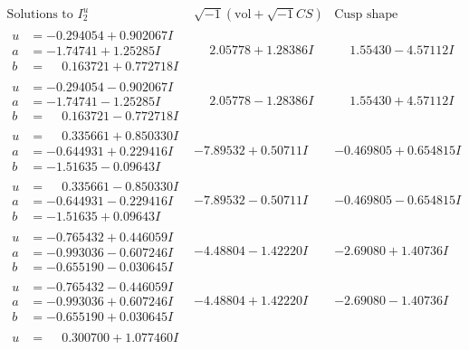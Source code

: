 \documentclass[1p]{elsarticle_modified}
\theoremstyle{definition}
\newcommand{\I}{\sqrt{-1}}
\begin{document}
$$\begin{array}{c|c|c}  
\text{Solutions to }I^u_{2}& \I (\text{vol} + \sqrt{-1}CS) & \text{Cusp shape}\\
 \hline 
\begin{aligned}
u &= -0.294054 + 0.902067 I \\
a &= -1.74741 + 1.25285 I \\
b &= \phantom{-}0.163721 + 0.772718 I\end{aligned}
 & \phantom{-}2.05778 + 1.28386 I & \phantom{-}1.55430 - 4.57112 I \\ \hline\begin{aligned}
u &= -0.294054 - 0.902067 I \\
a &= -1.74741 - 1.25285 I \\
b &= \phantom{-}0.163721 - 0.772718 I\end{aligned}
 & \phantom{-}2.05778 - 1.28386 I & \phantom{-}1.55430 + 4.57112 I \\ \hline\begin{aligned}
u &= \phantom{-}0.335661 + 0.850330 I \\
a &= -0.644931 + 0.229416 I \\
b &= -1.51635 - 0.09643 I\end{aligned}
 & -7.89532 + 0.50711 I & -0.469805 + 0.654815 I \\ \hline\begin{aligned}
u &= \phantom{-}0.335661 - 0.850330 I \\
a &= -0.644931 - 0.229416 I \\
b &= -1.51635 + 0.09643 I\end{aligned}
 & -7.89532 - 0.50711 I & -0.469805 - 0.654815 I \\ \hline\begin{aligned}
u &= -0.765432 + 0.446059 I \\
a &= -0.993036 - 0.607246 I \\
b &= -0.655190 - 0.030645 I\end{aligned}
 & -4.48804 - 1.42220 I & -2.69080 + 1.40736 I \\ \hline\begin{aligned}
u &= -0.765432 - 0.446059 I \\
a &= -0.993036 + 0.607246 I \\
b &= -0.655190 + 0.030645 I\end{aligned}
 & -4.48804 + 1.42220 I & -2.69080 - 1.40736 I \\ \hline\begin{aligned}
u &= \phantom{-}0.300700 + 1.077460 I \\

\end{aligned}
\end{array}$$
\end{document}
